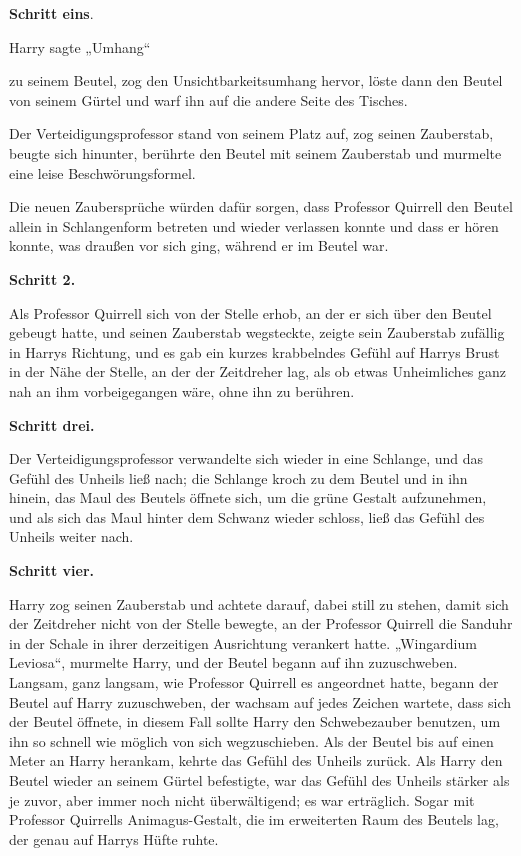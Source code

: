 {\textbf{Schritt eins}.

Harry sagte „Umhang“

zu seinem Beutel, zog den Unsichtbarkeitsumhang hervor, löste dann den Beutel von seinem Gürtel und warf ihn auf die andere Seite des Tisches.

Der Verteidigungsprofessor stand von seinem Platz auf, zog seinen Zauberstab, beugte sich hinunter, berührte den Beutel mit seinem Zauberstab und murmelte eine leise Beschwörungsformel.

Die neuen Zaubersprüche würden dafür sorgen, dass Professor Quirrell den Beutel allein in Schlangenform betreten und wieder verlassen konnte und dass er hören konnte, was draußen vor sich ging, während er im Beutel war.

\textbf{Schritt 2.}

Als Professor Quirrell sich von der Stelle erhob, an der er sich über den Beutel gebeugt hatte, und seinen Zauberstab wegsteckte, zeigte sein Zauberstab zufällig in Harrys Richtung, und es gab ein kurzes krabbelndes Gefühl auf Harrys Brust in der Nähe der Stelle, an der der Zeitdreher lag, als ob etwas Unheimliches ganz nah an ihm vorbeigegangen wäre, ohne ihn zu berühren.

\textbf{Schritt drei.}

Der Verteidigungsprofessor verwandelte sich wieder in eine Schlange, und das Gefühl des Unheils ließ nach; die Schlange kroch zu dem Beutel und in ihn hinein, das Maul des Beutels öffnete sich, um die grüne Gestalt aufzunehmen, und als sich das Maul hinter dem Schwanz wieder schloss, ließ das Gefühl des Unheils weiter nach.

\textbf{Schritt vier.}

Harry zog seinen Zauberstab und achtete darauf, dabei still zu stehen, damit sich der Zeitdreher nicht von der Stelle bewegte, an der Professor Quirrell die Sanduhr in der Schale in ihrer derzeitigen Ausrichtung verankert hatte. „Wingardium Leviosa“, murmelte Harry, und der Beutel begann auf ihn zuzuschweben. Langsam, ganz langsam, wie Professor Quirrell es angeordnet hatte, begann der Beutel auf Harry zuzuschweben, der wachsam auf jedes Zeichen wartete, dass sich der Beutel öffnete, in diesem Fall sollte Harry den Schwebezauber benutzen, um ihn so schnell wie möglich von sich wegzuschieben. Als der Beutel bis auf einen Meter an Harry herankam, kehrte das Gefühl des Unheils zurück. Als Harry den Beutel wieder an seinem Gürtel befestigte, war das Gefühl des Unheils stärker als je zuvor, aber immer noch nicht überwältigend; es war erträglich. Sogar mit Professor Quirrells Animagus-Gestalt, die im erweiterten Raum des Beutels lag, der genau auf Harrys Hüfte ruhte.

}
